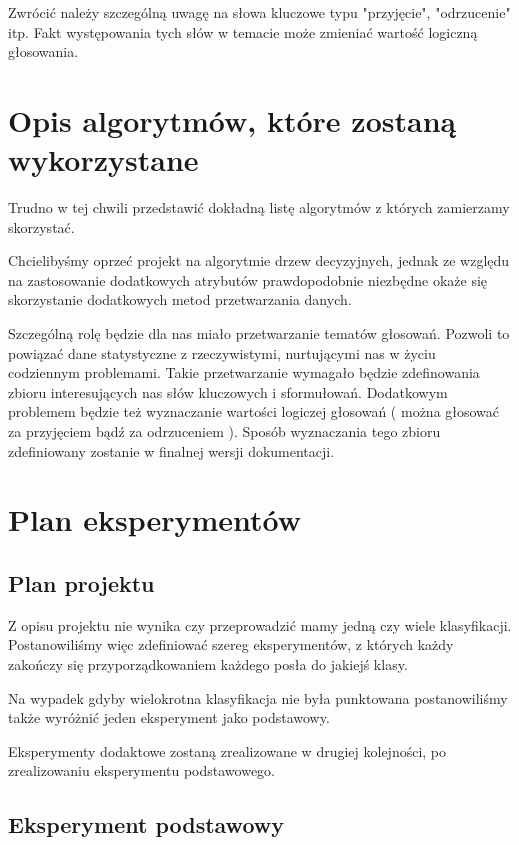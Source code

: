 \documentclass[a4 14pt]{report}
\begin{document}
\begin{itemize}
					Zwrócić należy szczególną uwagę na słowa kluczowe typu "przyjęcie", "odrzucenie" itp.
					Fakt występowania tych słów w temacie może zmieniać wartość logiczną głosowania.
			\end{itemize}


	\section{Opis algorytmów, które zostaną wykorzystane}

		Trudno w tej chwili przedstawić dokładną listę algorytmów z których zamierzamy skorzystać.

		Chcielibyśmy oprzeć projekt na algorytmie drzew decyzyjnych, jednak ze względu na zastosowanie dodatkowych atrybutów prawdopodobnie niezbędne okaże się skorzystanie dodatkowych metod przetwarzania danych.

		Szczególną rolę będzie dla nas miało przetwarzanie tematów głosowań. Pozwoli to powiązać dane statystyczne z rzeczywistymi, nurtującymi nas w życiu codziennym problemami. 
		Takie przetwarzanie wymagało będzie zdefinowania zbioru interesujących nas słów kluczowych i sformułowań.
		Dodatkowym problemem będzie też wyznaczanie wartości logiczej głosowań ( można głosować za przyjęciem bądź za odrzuceniem ). Sposób wyznaczania tego zbioru zdefiniowany zostanie w finalnej wersji dokumentacji.
	

	\section{Plan eksperymentów}

		\subsection{Plan projektu}
			
			Z opisu projektu nie wynika czy przeprowadzić mamy jedną czy wiele klasyfikacji. 
			Postanowiliśmy więc zdefiniować szereg eksperymentów, z których każdy zakończy się przyporządkowaniem każdego posła do jakiejś klasy.

			Na wypadek gdyby wielokrotna klasyfikacja nie była punktowana postanowiliśmy także wyróżnić jeden eksperyment jako podstawowy. 

			Eksperymenty dodaktowe zostaną zrealizowane w drugiej kolejności, po zrealizowaniu eksperymentu podstawowego.
		
		\subsection{Eksperyment podstawowy}
\end{document}
